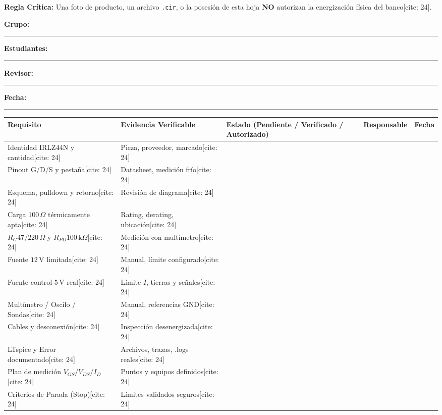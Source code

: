 \documentclass[10pt, a4paper, landscape]{article}
\begin{document}
\begin{tcolorbox}[colback=ucbblue!5, colframe=ucbblue, title=\textbf{Control G1 — IRLZ44N (Candidato) $\cdot$ Etapa E1[cite: 24]}]
    \textbf{Regla Crítica:} Una foto de producto, un archivo \texttt{.cir}, o la posesión de esta hoja \textbf{NO} autorizan la energización física del banco[cite: 24].
\end{tcolorbox}

\noindent\textbf{Grupo:} \rule{2cm}{0.15mm} \quad \textbf{Estudiantes:} \rule{6cm}{0.15mm} \quad \textbf{Revisor:} \rule{3cm}{0.15mm} \quad \textbf{Fecha:} \rule{3cm}{0.15mm}

\par\vspace{0.3cm}\noindent
\renewcommand{\arraystretch}{1.5}
\begin{tabularx}{\linewidth}{|>{\raggedright\arraybackslash}p{4.5cm}|>{\raggedright\arraybackslash}p{4cm}|>{\raggedright\arraybackslash}X|p{2.5cm}|p{2cm}|}
\hline
\rowcolor{gray!20}
\textbf{Requisito} & \textbf{Evidencia Verificable} & \textbf{Estado (Pendiente / Verificado / Autorizado)} & \textbf{Responsable} & \textbf{Fecha} \\ \hline
Identidad IRLZ44N y cantidad[cite: 24] & Pieza, proveedor, marcado[cite: 24] & & & \\ \hline
Pinout G/D/S y pestaña[cite: 24] & Datasheet, medición frío[cite: 24] & & & \\ \hline
Esquema, pulldown y retorno[cite: 24] & Revisión de diagrama[cite: 24] & & & \\ \hline
Carga $100\,\Omega$ térmicamente apta[cite: 24] & Rating, derating, ubicación[cite: 24] & & & \\ \hline
$R_G 47/220\,\Omega$ y $R_{PD} 100\,\text{k}\Omega$[cite: 24] & Medición con multímetro[cite: 24] & & & \\ \hline
Fuente $12\,\text{V}$ limitada[cite: 24] & Manual, límite configurado[cite: 24] & & & \\ \hline
Fuente control $5\,\text{V}$ real[cite: 24] & Límite $I$, tierras y señales[cite: 24] & & & \\ \hline
Multímetro / Oscilo / Sondas[cite: 24] & Manual, referencias GND[cite: 24] & & & \\ \hline
Cables y desconexión[cite: 24] & Inspección desenergizada[cite: 24] & & & \\ \hline
LTspice y Error documentado[cite: 24] & Archivos, trazas, .logs reales[cite: 24] & & & \\ \hline
Plan de medición $V_{GS}/V_{DS}/I_D$[cite: 24] & Puntos y equipos definidos[cite: 24] & & & \\ \hline
Criterios de Parada (Stop)[cite: 24] & Límites validados seguros[cite: 24] & & & \\ \hline
\end{tabularx}
\end{document}
